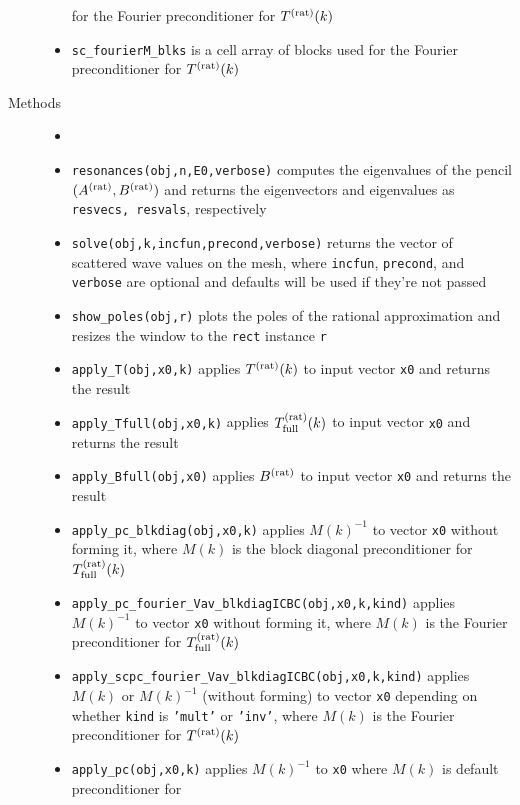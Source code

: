 \begin{description}
\begin{itemize}
          for the Fourier preconditioner for $T^{(\text{rat})}(k)$
    \item {\tt sc\_fourierM\_blks} is a cell array of blocks used for the
          Fourier preconditioner for $T^{(\text{rat})}(k)$
   \end{itemize}
 \item[Methods]
   \begin{itemize}
    \item[]
    \item {\tt resonances(obj,n,E0,verbose)} computes the eigenvalues of
          the pencil $(A^{(\text{rat})},B^{(\text{rat})})$ and returns the eigenvectors and eigenvalues
          as {\tt resvecs, resvals}, respectively
    \item {\tt solve(obj,k,incfun,precond,verbose)} returns the vector of
          scattered wave values on the mesh, where {\tt incfun}, {\tt precond},
          and {\tt verbose} are optional and defaults will be used if they're
          not passed
    \item {\tt show\_poles(obj,r)} plots the poles of the rational approximation
          and resizes the window to the {\tt rect} instance {\tt r}
    \item {\tt apply\_T(obj,x0,k)} applies $T^{(\text{rat})}(k)$ to input vector
          {\tt x0} and returns the result
    \item {\tt apply\_Tfull(obj,x0,k)} applies $T^{(\text{rat})}_{\text{full}}(k)$
          to input vector {\tt x0} and returns the result
    \item {\tt apply\_Bfull(obj,x0)} applies $B^{(\text{rat})}$ to input vector
          {\tt x0} and returns the result
    \item {\tt apply\_pc\_blkdiag(obj,x0,k)} applies $M(k)^{-1}$ to vector
          {\tt x0} without forming it, where $M(k)$ is the block diagonal
          preconditioner for $T^{(\text{rat})}_{\text{full}}(k)$
    \item {\tt apply\_pc\_fourier\_Vav\_blkdiagICBC(obj,x0,k,kind)}
          applies $M(k)^{-1}$ to vector {\tt x0} without forming it,
          where $M(k)$ is the Fourier preconditioner for
          $T^{(\text{rat})}_{\text{full}}(k)$
    \item {\tt apply\_scpc\_fourier\_Vav\_blkdiagICBC(obj,x0,k,kind)}
          applies $M(k)$ or $M(k)^{-1}$ (without forming)
          to vector {\tt x0} depending on
          whether {\tt kind} is {\tt 'mult'} or {\tt 'inv'}, where
          $M(k)$ is the Fourier preconditioner for $T^{(\text{rat})}(k)$
    \item {\tt apply\_pc(obj,x0,k)} applies $M(k)^{-1}$ to
          {\tt x0} where $M(k)$ is default preconditioner for

\end{itemize}
\end{description}
